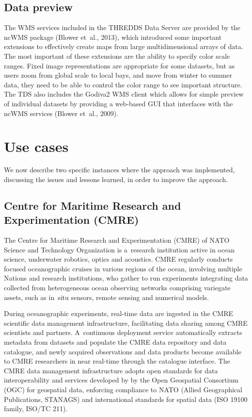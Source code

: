 \documentclass[osd, online, hvmath]{copernicus}
\begin{document}
\subsection{Data preview}

The WMS services included in the
THREDDS Data Server are provided by the ncWMS package (Blower et~al.,
2013), which introduced some important extensions to effectively create maps from large multidimensional arrays of data.  The most important of these extensions are the ability to specify color scale ranges.  Fixed image representations are appropriate for some datasets, but as users zoom from global scale to local bays, and move from winter to summer data, they need to be able to control the color range to see important structure.  The TDS also includes the Godiva2 WMS client which allows for
simple preview of individual datasets by providing a web-based GUI that interfaces with the ncWMS services (Blower et~al., 2009).

\section{Use cases}

We now describe two specific instances where the approach was
implemented,  discussing the issues and lessons learned, in order to improve the approach.

\subsection{Centre for Maritime Research and Experimentation (CMRE)}

The Centre for Maritime Research and Experimentation (CMRE) of NATO
Science and Technology Organization is a~research institution active
in ocean science, underwater robotics, optics and acoustics. 
CMRE regularly conducts focused oceanographic cruises in various regions of the ocean,
involving multiple Nations and research institutions, who gather to run
experiments integrating data collected from heterogeneous ocean
observing networks comprising variegate assets, such as in~situ sensors, remote sensing and numerical
models.

During oceanographic experiments, real-time data are ingested in the CMRE scientific
data management infrastructure, facilitating data sharing among CMRE scientists and partners.  
A~continuous deployment service automatically extracts metadata from datasets and populate the CMRE data repository and data catalogue, and newly acquired observations and data products become available to CMRE researchers in near real-time through the catalogue interface.
The CMRE data management infrastructure adopts open standards for data interoperability and services developed by by the Open
Geospatial Consortium (OGC) for geospatial data, enforcing compliance to NATO (Allied Geographical Publications, STANAGS) and international standards for spatial data (ISO 19100 family, ISO/TC 211). 
\end{document}

